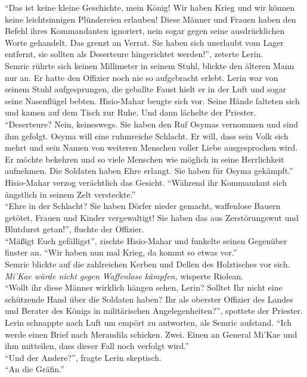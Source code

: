 ``Das ist keine kleine Geschichte, mein König! Wir haben Krieg und wir können keine leichtsinnigen 
Plündereien erlauben! Diese Männer und Frauen haben den Befehl ihres Kommandanten ignoriert, nein 
sogar gegen seine ausdrücklichen Worte gehandelt. Das grenzt an Verrat. Sie haben sich unerlaubt 
vom Lager entfernt, sie sollten als Deserteure hingerichtet werden!'', zeterte Lerin.\\
Semric rührte sich keinen Millimeter in seinem Stuhl, blickte den älteren Mann nur an. Er hatte den 
Offizier noch nie so aufgebracht erlebt. Lerin war von seinem Stuhl aufgesprungen, die geballte 
Faust hielt er in der Luft und sogar seine Nasenflügel bebten. Hisio-Mahar beugte sich vor. Seine 
Hände falteten sich und kamen auf dem Tisch zur Ruhe. Und dann lächelte der Priester. ``Deserteure? 
Nein, keineswegs. Sie haben den Ruf Osymas vernommen und sind ihm gefolgt. Osyma will eine 
ruhmreiche Schlacht. Er will, dass sein Volk sich mehrt und sein Namen von weiteren Menschen voller 
Liebe ausgesprochen wird. Er möchte bekehren und so viele Menschen wie möglich in seine 
Herrlichkeit aufnehmen. Die Soldaten haben Ehre erlangt. Sie haben für Osyma gekämpft.'' 
Hisio-Mahar verzog verächtlich das Gesicht. ``Während ihr Kommandant sich ängstlich in seinem Zelt 
versteckte.''\\
``Ehre in der Schlacht? Sie haben Dörfer nieder gemacht, waffenlose Bauern getötet, Frauen und 
Kinder vergewaltigt! Sie haben das aus Zerstörungswut und Blutdurst getan!'', fluchte der Offizier. 
\\
``Mäßigt Euch gefälligst'', zischte Hisio-Mahar und funkelte seinen Gegenüber finster an. ``Wir 
haben nun mal Krieg, da kommt so etwas vor.''\\
Semric blickte auf die zahlreichen Kerben und Dellen des Holztisches vor sich. \textit{Mi'Kae würde 
nicht gegen Waffenlose kämpfen,} wisperte Riolean.\\
``Wollt ihr diese Männer wirklich hängen sehen, Lerin? Solltet Ihr nicht eine schützende Hand über 
die Soldaten haben? Ihr als oberster Offizier des Landes und Berater des Königs in militärischen 
Angelegenheiten?'', spottete der Priester.\\
Lerin schnappte nach Luft um empört zu antworten, als Semric aufstand. ``Ich werde einen Brief nach 
Merandila schicken. Zwei. Einen an General Mi'Kae und ihm mitteilen, dass dieser Fall noch 
verfolgt wird.''\\
``Und der Andere?'', fragte Lerin skeptisch.\\
``An die Gräfin.''\\
